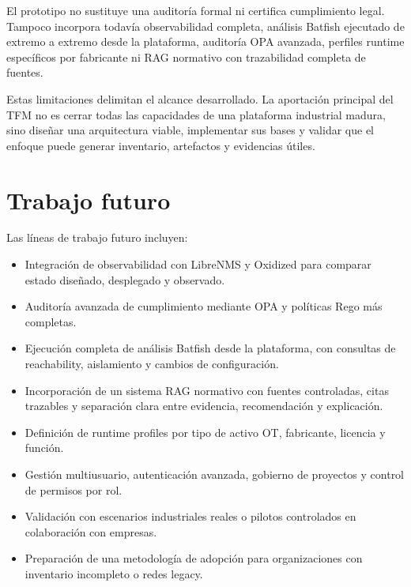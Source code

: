 El prototipo no sustituye una auditoría formal ni certifica cumplimiento legal. Tampoco incorpora todavía observabilidad completa, análisis Batfish ejecutado de extremo a extremo desde la plataforma, auditoría OPA avanzada, perfiles runtime específicos por fabricante ni RAG normativo con trazabilidad completa de fuentes.

Estas limitaciones delimitan el alcance desarrollado. La aportación principal del TFM no es cerrar todas las capacidades de una plataforma industrial madura, sino diseñar una arquitectura viable, implementar sus bases y validar que el enfoque puede generar inventario, artefactos y evidencias útiles.

\section{Trabajo futuro} \label{sec:trabajo-futuro}

Las líneas de trabajo futuro incluyen:

\begin{itemize}
    \item Integración de observabilidad con LibreNMS y Oxidized para comparar estado diseñado, desplegado y observado.
    \item Auditoría avanzada de cumplimiento mediante OPA y políticas Rego más completas.
    \item Ejecución completa de análisis Batfish desde la plataforma, con consultas de reachability, aislamiento y cambios de configuración.
    \item Incorporación de un sistema RAG normativo con fuentes controladas, citas trazables y separación clara entre evidencia, recomendación y explicación.
    \item Definición de runtime profiles por tipo de activo OT, fabricante, licencia y función.
    \item Gestión multiusuario, autenticación avanzada, gobierno de proyectos y control de permisos por rol.
    \item Validación con escenarios industriales reales o pilotos controlados en colaboración con empresas.
    \item Preparación de una metodología de adopción para organizaciones con inventario incompleto o redes legacy.
\end{itemize}
